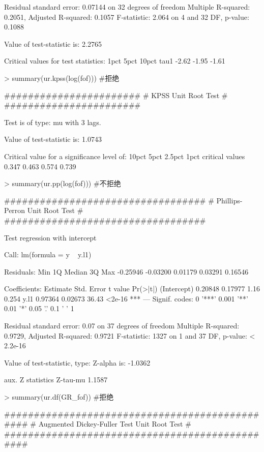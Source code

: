 \documentclass{article}
\begin{document}
\begin{Schunk}
\begin{Soutput}
Residual standard error: 0.07144 on 32 degrees of freedom
Multiple R-squared:  0.2051,	Adjusted R-squared:  0.1057 
F-statistic: 2.064 on 4 and 32 DF,  p-value: 0.1088


Value of test-statistic is: 2.2765 

Critical values for test statistics: 
      1pct  5pct 10pct
tau1 -2.62 -1.95 -1.61
\end{Soutput}
\begin{Sinput}
> summary(ur.kpss(log(fof))) #拒绝
\end{Sinput}
\begin{Soutput}
####################### 
# KPSS Unit Root Test # 
####################### 

Test is of type: mu with 3 lags. 

Value of test-statistic is: 1.0743 

Critical value for a significance level of: 
                10pct  5pct 2.5pct  1pct
critical values 0.347 0.463  0.574 0.739
\end{Soutput}
\begin{Sinput}
> summary(ur.pp(log(fof))) #不拒绝
\end{Sinput}
\begin{Soutput}
################################## 
# Phillips-Perron Unit Root Test # 
################################## 

Test regression with intercept 


Call:
lm(formula = y ~ y.l1)

Residuals:
     Min       1Q   Median       3Q      Max 
-0.25946 -0.03200  0.01179  0.03291  0.16546 

Coefficients:
            Estimate Std. Error t value Pr(>|t|)    
(Intercept)  0.20848    0.17977    1.16    0.254    
y.l1         0.97364    0.02673   36.43   <2e-16 ***
---
Signif. codes:  0 '***' 0.001 '**' 0.01 '*' 0.05 '.' 0.1 ' ' 1

Residual standard error: 0.07 on 37 degrees of freedom
Multiple R-squared:  0.9729,	Adjusted R-squared:  0.9721 
F-statistic:  1327 on 1 and 37 DF,  p-value: < 2.2e-16


Value of test-statistic, type: Z-alpha  is: -1.0362 

         aux. Z statistics
Z-tau-mu            1.1587
\end{Soutput}
\begin{Sinput}
> summary(ur.df(GR_fof)) #拒绝
\end{Sinput}
\begin{Soutput}
############################################### 
# Augmented Dickey-Fuller Test Unit Root Test # 
############################################### 


\end{Soutput}
\end{Schunk}
\end{document}
